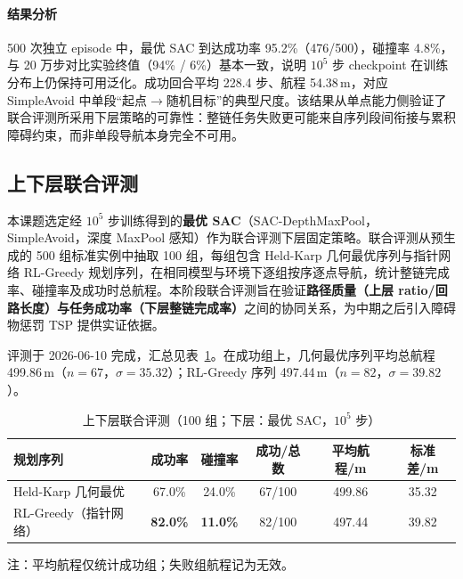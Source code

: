 \paragraph{结果分析}
500 次独立 episode 中，最优 SAC 到达成功率 95.2\%（476/500），碰撞率 4.8\%，与 20 万步对比实验终值（94\% / 6\%）基本一致，说明 $10^5$ 步 checkpoint 在训练分布上仍保持可用泛化。成功回合平均 228.4 步、航程 54.38\,m，对应 SimpleAvoid 中单段``起点$\to$随机目标''的典型尺度。该结果从单点能力侧验证了联合评测所采用下层策略的可靠性：整链任务失败更可能来自序列段间衔接与累积障碍约束，而非单段导航本身完全不可用。

\subsection{上下层联合评测}

本课题选定经 $10^5$ 步训练得到的\textbf{最优 SAC}（SAC-DepthMaxPool，SimpleAvoid，深度 MaxPool 感知）作为联合评测下层固定策略。联合评测从预生成的 500 组标准实例中抽取 100 组，每组包含 Held-Karp 几何最优序列与指针网络 RL-Greedy 规划序列，在相同模型与环境下逐组按序逐点导航，统计整链完成率、碰撞率及成功时总航程。本阶段联合评测旨在验证\textbf{路径质量（上层 ratio/回路长度）与任务成功率（下层整链完成率）}之间的协同关系，为中期之后引入障碍物惩罚 TSP 提供实证依据。

评测于 2026-06-10 完成，汇总见表~\ref{tab:joint-eval}。在成功组上，几何最优序列平均总航程 499.86\,m（$n=67$，$\sigma=35.32$）；RL-Greedy 序列 497.44\,m（$n=82$，$\sigma=39.82$）。

\begin{table}[htbp]
  \centering
  \caption{上下层联合评测（100 组；下层：最优 SAC，$10^5$ 步）}
  \label{tab:joint-eval}
  \begin{tabular}{lccccc}
    \toprule
    规划序列 & 成功率 & 碰撞率 & 成功/总数 & 平均航程/m & 标准差/m \\
    \midrule
    Held-Karp 几何最优 & 67.0\% & 24.0\% & 67/100 & 499.86 & 35.32 \\
    RL-Greedy（指针网络） & \textbf{82.0\%} & \textbf{11.0\%} & 82/100 & 497.44 & 39.82 \\
    \bottomrule
  \end{tabular}

  \small 注：平均航程仅统计成功组；失败组航程记为无效。
\end{table}


